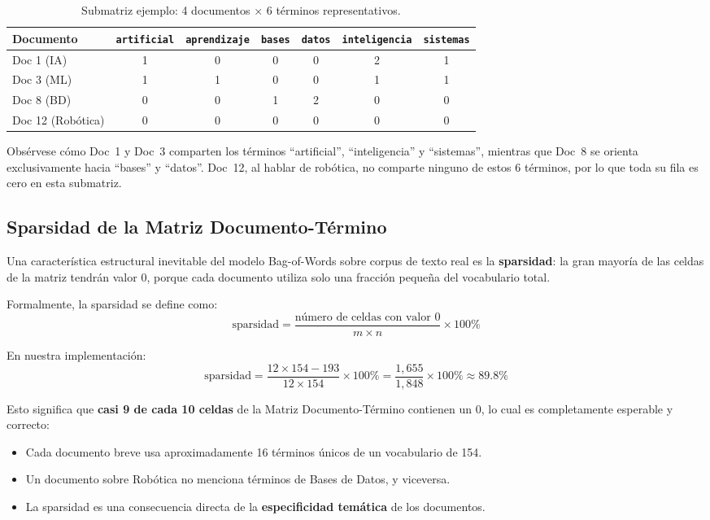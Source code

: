 \begin{table}[H]
\centering
\caption{Submatriz ejemplo: 4 documentos × 6 términos representativos.}
\label{tab:matriz_ejemplo}
\begin{tabular}{|l|c|c|c|c|c|c|}
\hline
\textbf{Documento} & \texttt{artificial} & \texttt{aprendizaje} & \texttt{bases} & \texttt{datos} & \texttt{inteligencia} & \texttt{sistemas} \\
\hline
Doc 1 (IA)            & 1 & 0 & 0 & 0 & 2 & 1 \\
Doc 3 (ML)            & 1 & 1 & 0 & 0 & 1 & 1 \\
Doc 8 (BD)            & 0 & 0 & 1 & 2 & 0 & 0 \\
Doc 12 (Robótica)     & 0 & 0 & 0 & 0 & 0 & 0 \\
\hline
\end{tabular}
\end{table}

Obsérvese cómo Doc~1 y Doc~3 comparten los términos ``artificial'', ``inteligencia'' y ``sistemas'', mientras que Doc~8 se orienta exclusivamente hacia ``bases'' y ``datos''. Doc~12, al hablar de robótica, no comparte ninguno de estos 6 términos, por lo que toda su fila es cero en esta submatriz.

\subsection{Sparsidad de la Matriz Documento-Término}

Una característica estructural inevitable del modelo Bag-of-Words sobre corpus de texto real es la \textbf{sparsidad}: la gran mayoría de las celdas de la matriz tendrán valor 0, porque cada documento utiliza solo una fracción pequeña del vocabulario total.

Formalmente, la sparsidad se define como:
\[
\text{sparsidad} = \frac{\text{número de celdas con valor } 0}{m \times n} \times 100\%
\]

En nuestra implementación:
\[
\text{sparsidad} = \frac{12 \times 154 - 193}{12 \times 154} \times 100\% = \frac{1{,}655}{1{,}848} \times 100\% \approx \mathbf{89.8\%}
\]

Esto significa que \textbf{casi 9 de cada 10 celdas} de la Matriz Documento-Término contienen un 0, lo cual es completamente esperable y correcto:

\begin{itemize}
    \item Cada documento breve usa aproximadamente 16 términos únicos de un vocabulario de 154.
    \item Un documento sobre Robótica no menciona términos de Bases de Datos, y viceversa.
    \item La sparsidad es una consecuencia directa de la \textbf{especificidad temática} de los documentos.
\end{itemize}

